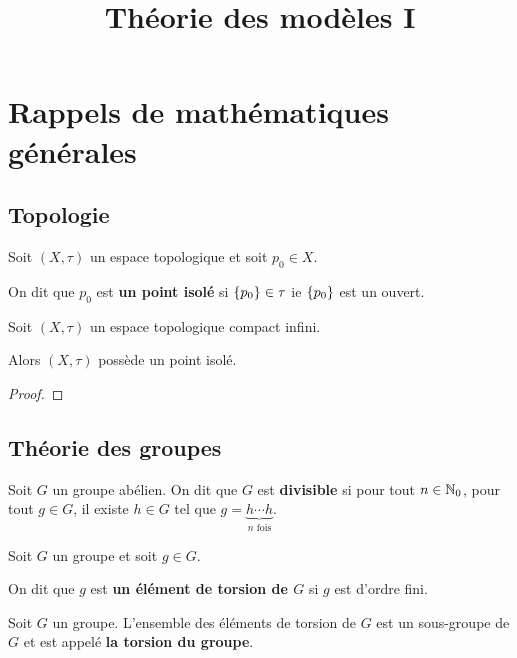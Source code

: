 \documentclass[a4paper, 12pt]{report}
\title{Théorie des modèles I}
\author{}
\begin{document}
\maketitle

\tableofcontents

\chapter{Rappels de mathématiques générales}

\section{Topologie}

\begin{definition} 
	Soit $(X, \tau)$ un espace topologique et soit $p_{0} \in X$.

	On dit que $p_{0}$ est \textbf{un point isolé} si $\left\{ p_{0} \right\} \in \tau$
	ie $\left\{ p_{0} \right\}$ est un ouvert.
\end{definition}

\begin{proposition}
	Soit $(X, \tau)$ un espace topologique compact infini.

	Alors $(X, \tau)$ possède un point isolé.
\end{proposition}

\ifdefined\outputproof
\begin{proof}

\end{proof}
\fi

\section{Théorie des groupes}

\begin{definition} 
	Soit $G$ un groupe abélien. On dit que $G$ est \textbf{divisible} si pour
	tout $n \in \mathbb{N}_{0}$, pour tout $g \in G$, il existe $h \in G$ tel que
	$g = \underbrace{h \cdots h}_{n \text{ fois}}$.
\end{definition}

\begin{definition} 
	Soit $G$ un groupe et soit $g \in G$.

	On dit que $g$ est \textbf{un élément de torsion de $G$} si $g$ est d'ordre
	fini.
\end{definition}

\begin{definition} 
	Soit $G$ un groupe.
	L'ensemble des éléments de torsion de $G$ est un sous-groupe de $G$ et est appelé
	\textbf{la torsion du groupe}.
\end{definition}
\end{document}
